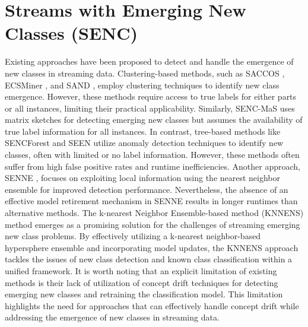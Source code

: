\section{Streams with Emerging New Classes (SENC)}
\label{sec:3_4_emergence}
Existing approaches have been proposed to detect and handle the emergence of new classes in streaming data. Clustering-based methods, such as SACCOS \cite{gao2020saccos}, ECSMiner \cite{masud2010classification}, and SAND \cite{haque2016sand}, employ clustering techniques to identify new class emergence. However, these methods require access to true labels for either parts or all instances, limiting their practical applicability. Similarly, SENC-MaS \cite{mu2017streaming} uses matrix sketches for detecting emerging new classes but assumes the availability of true label information for all instances. In contrast, tree-based methods like SENCForest \cite{mu2017classification} and SEEN \cite{zhu2020semi} utilize anomaly detection techniques to identify new classes, often with limited or no label information. However, these methods often suffer from high false positive rates and runtime inefficiencies. Another approach, SENNE \cite{cai2019nearest}, focuses on exploiting local information using the nearest neighbor ensemble for improved detection performance.  Nevertheless, the absence of an effective model retirement mechanism in SENNE results in longer runtimes than alternative methods. The k-nearest Neighbor Ensemble-based method (KNNENS) \cite{zhang2022knnens} method emerges as a promising solution for the challenges of streaming emerging new class problems. By effectively utilizing a k-nearest neighbor-based hypersphere ensemble and incorporating model updates, the KNNENS approach tackles the issues of new class detection and known class classification within a unified framework. It is worth noting that an explicit limitation of existing methods is their lack of utilization of concept drift techniques for detecting emerging new classes and retraining the classification model. This limitation highlights the need for approaches that can effectively handle concept drift while addressing the emergence of new classes in streaming data.
